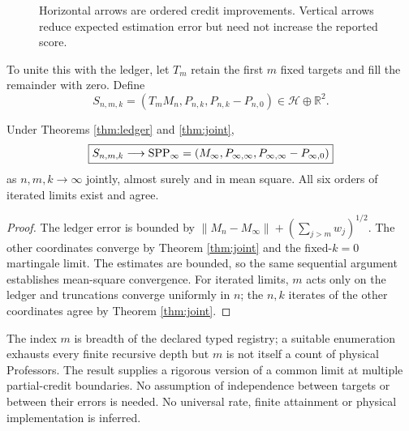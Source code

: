 \documentclass[11pt]{article}
\begin{document}
\begin{figure}[ht]
\centering
{}
\caption{Horizontal arrows are ordered credit improvements. Vertical arrows reduce expected estimation error but need not increase the reported score.}
\end{figure}

To unite this with the ledger, let $T_m$ retain the first $m$ fixed targets and fill the remainder with zero. Define
\[S_{n,m,k}=(T_m M_n, P_{n,k}, P_{n,k}-P_{n,0})\in\mathcal H\oplus\mathbb R^2.\]
\begin{corollary}\label{cor:spp}
Under Theorems \ref{thm:ledger} and \ref{thm:joint},
\begin{equation}\boxed{S_{n,m,k}\longrightarrow \mathrm{SPP}_\infty=(M_\infty,P_{\infty,\infty},P_{\infty,\infty}-P_{\infty,0})}\end{equation}
as $n,m,k\to\infty$ jointly, almost surely and in mean square. All six orders of iterated limits exist and agree.
\end{corollary}
\begin{proof}The ledger error is bounded by $\|M_n-M_\infty\|+(\sum_{j>m}w_j)^{1/2}$. The other coordinates converge by Theorem \ref{thm:joint} and the fixed-$k=0$ martingale limit. The estimates are bounded, so the same sequential argument establishes mean-square convergence. For iterated limits, $m$ acts only on the ledger and truncations converge uniformly in $n$; the $n,k$ iterates of the other coordinates agree by Theorem \ref{thm:joint}.\end{proof}
The index $m$ is breadth of the declared typed registry; a suitable enumeration exhausts every finite recursive depth but $m$ is not itself a count of physical Professors. The result supplies a rigorous version of a common limit at multiple partial-credit boundaries. No assumption of independence between targets or between their errors is needed. No universal rate, finite attainment or physical implementation is inferred.
\end{document}
